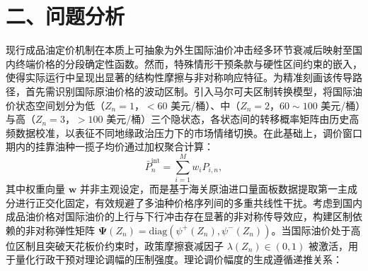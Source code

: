 \documentclass{mcmthesis}
\begin{document}
\section{ 二、问题分析}

现行成品油定价机制在本质上可抽象为外生国际油价冲击经多环节衰减后映射至国内终端价格的分段确定性函数。然而，特殊情形干预条款与硬性区间约束的嵌入，使得实际运行中呈现出显著的结构性摩擦与非对称响应特征。为精准刻画该传导路径，首先需识别国际原油价格的波动区制。引入马尔可夫区制转换模型，将国际油价状态空间划分为低（$Z_n=1$，$<60$ 美元/桶）、中（$Z_n=2$，$60\sim100$ 美元/桶）与高（$Z_n=3$，$>100$ 美元/桶）三个隐状态，各状态间的转移概率矩阵由历史高频数据校准，以表征不同地缘政治压力下的市场情绪切换。在此基础上，调价窗口期内的挂靠油种一揽子均价通过加权聚合计算：
\begin{equation}
\bar{P}_n^{\text{int}} = \sum_{i=1}^{M} w_i P_{i,n},
\end{equation}
其中权重向量 $\mathbf{w}$ 并非主观设定，而是基于海关原油进口量面板数据提取第一主成分进行正交化固定，有效规避了多油种价格序列间的多重共线性干扰。考虑到国内成品油价格对国际油价的上行与下行冲击存在显著的非对称传导效应，构建区制依赖的非对称弹性矩阵 $\mathbf{\Psi}(Z_n)=\text{diag}(\psi^+(Z_n), \psi^-(Z_n))$。当国际油价处于高位区制且突破天花板价约束时，政策摩擦衰减因子 $\lambda(Z_n)\in(0,1)$ 被激活，用于量化行政干预对理论调幅的压制强度。理论调价幅度的生成遵循递推关系：
\end{document}
